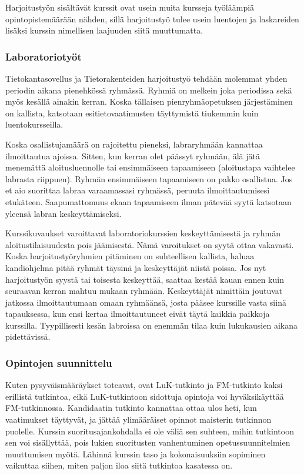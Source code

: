 \documentclass[../ala_hataile.tex]{subfiles}
\begin{document}
	Harjoitustyön sisältävät kurssit ovat
	usein muita kursseja työläämpiä opintopistemäärään
	nähden, sillä harjoitustyö
	tulee usein luentojen ja laskareiden lisäksi
	kurssin nimellisen laajuuden siitä muuttumatta.
	
	\subsubsection*{Laboratoriotyöt}
	Tietokantasovellus
	ja Tietorakenteiden harjoitustyö
	tehdään molemmat yhden periodin aikana 
	pienehkössä ryhmässä. Ryhmiä
	on melkein joka periodissa sekä myös kesällä
	ainakin kerran. Koska tällaisen pienryhmäopetuksen
	järjestäminen on kallista,
	katsotaan esitietovaatimusten täyttymistä
	tiukemmin kuin luentokursseilla.
	
	Koska osallistujamäärä on rajoitettu pieneksi,
	labraryhmään kannattaa ilmoittautua
	ajoissa. Sitten,
	kun kerran olet päässyt ryhmään, älä jätä
	menemättä aloitusluennolle tai ensimmäiseen
	tapaamiseen (aloitustapa vaihtelee
	labrasta riippuen). Ryhmän ensimmäiseen
	tapaamiseen on pakko osallistua. Jos et aio
	suorittaa labraa varaamassasi ryhmässä,
	peruuta ilmoittautumisesi etukäteen. Saapumattomuus
	ekaan tapaamiseen ilman
	pätevää syytä katsotaan yleensä labran keskeyttämiseksi.
	
	Kurssikuvaukset varoittavat laboratoriokurssien
	keskeyttämisestä ja ryhmän aloitustilaisuudesta
	pois jäämisestä. Nämä varoitukset
	on syytä ottaa vakavasti. Koska harjoitustyöryhmien
	pitäminen on suhteellisen kallista,
	haluaa kandiohjelma pitää ryhmät täysinä ja
	keskeyttäjät niistä poissa. Jos nyt harjoitustyön
	syystä tai toisesta keskeyttää, saattaa
	kestää kauan ennen kuin seuraavan kerran
	mahtuu mukaan ryhmään. Keskeyttäjät nimittäin
	joutuvat jatkossa ilmoittautumaan
	omaan ryhmäänsä, josta pääsee kurssille
	vasta siinä tapauksessa, kun ensi kertaa ilmoittautuneet
	eivät täytä kaikkia paikkoja
	kurssilla. Tyypillisesti kesän labroissa on enemmän tilaa kuin lukukausien aikana pidettävissä.
	
	\subsubsection*{Opintojen suunnittelu}
	Kuten pysyväismääräykset toteavat, ovat LuK-tutkinto
	ja FM-tutkinto kaksi erillistä tutkintoa,
	eikä LuK-tutkintoon sidottuja opintoja
	voi hyväksikäyttää FM-tutkinnossa. Kandidaatin
	tutkinto kannattaa ottaa ulos heti,
	kun vaatimukset täyttyvät, ja jättää ylimääräiset
	opinnot maisterin tutkinnon puolelle.
	Kurssin suoritusajankohdalla ei ole väliä
	sen suhteen, mihin tutkintoon sen voi sisällyttää,
	pois lukien suoritusten vanhentuminen
	opetus\-suunnitelmien muuttumisen
	myötä. Lähinnä kurssin taso ja kokonaisuuksiin
	sopiminen vaikuttaa siihen, miten
	paljon iloa siitä tutkintoa kasatessa on.
	
\end{document}
